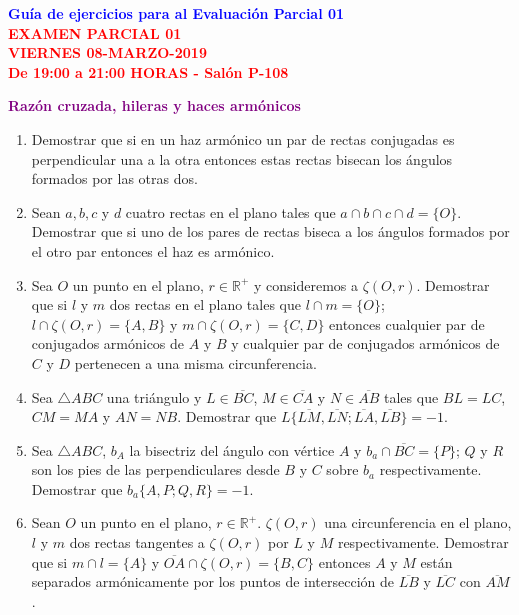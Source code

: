 \documentclass[12pt]{report}
\numberwithin{section}{chapter}
\newcommand{\R}{\mathbb R}
\begin{document}
\begin{center}
\textcolor{blue}{\textbf{\large Guía de ejercicios para al Evaluación Parcial 01}}\\
\vspace{0.5 cm}
\textcolor{red}{\textbf{\large EXAMEN PARCIAL 01 \\ VIERNES
08-MARZO-2019\\ De 19:00 a 21:00 HORAS - Salón P-108}}
\end{center}


\begin{center}
\textcolor{purple}{\textbf{\large Razón cruzada, hileras  y haces armónicos}}
\end{center}

\begin{enumerate}

\item Demostrar que si en un haz armónico un par de rectas conjugadas es perpendicular una a la otra entonces estas rectas bisecan los ángulos formados por las otras dos.

\item Sean $a,b,c$ y $d$ cuatro rectas en el plano tales que $a\cap b \cap c \cap d =\{O\}$. Demostrar que si uno de los pares de rectas biseca a los ángulos formados por el otro par entonces el haz es armónico.

\item Sea $O$ un punto en el plano, $r \in \R^+$ y consideremos a $\zeta (O,r)$. Demostrar que si $l$ y $m$ dos rectas en el plano tales que $l \cap m = \{O\}$; $l \cap \zeta(O,r) = \{A,B\}$ y $m \cap \zeta(O,r) = \{C,D\}$ entonces cualquier par de conjugados armónicos de $A$ y $B$ y cualquier par de conjugados armónicos de $C$ y $D$ pertenecen a una misma circunferencia.

\item Sea $\triangle ABC$ una triángulo y $L \in \overline{BC}$, $M \in \overline{CA}$ y $N \in \overline{AB}$ tales que $BL=LC$, $CM=MA$ y $AN=NB$. Demostrar que $L\{\overline{LM},\overline{LN};\overline{LA},\overline{LB}\}=-1$.

\item Sea $\triangle ABC$, $b_A$ la bisectriz del \'angulo con v\'ertice $A$ y $b_a \cap \overline{BC}=\{P\}$; $Q$ y $R$ son los pies de las perpendiculares desde $B$ y $C$ sobre $b_a$ respectivamente. Demostrar que $b_a\{A,P;Q,R\}= -1$.

\item Sean $O$ un punto en el plano, $r \in \R^+$. $\zeta (O,r)$ una circunferencia en el plano, $l$ y $m$ dos rectas tangentes a $\zeta(O,r)$ por $L$ y $M$ respectivamente. Demostrar que si $m \cap l = \{A\} $ y  $\overline{OA} \cap \zeta(O,r)=\{B,C\}$ entonces $A$ y $M$ están separados armónicamente por los puntos de intersección de $\overline{LB}$ y $\overline{LC}$ con $\overline{AM}$.


\end{enumerate}
\end{document}
